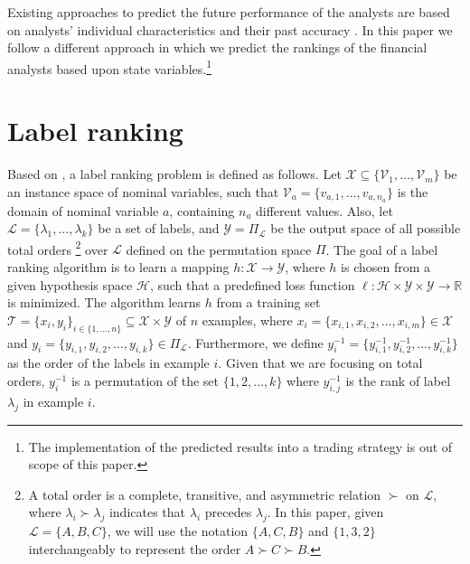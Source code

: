 \documentclass{article}\usepackage[]{graphicx}\usepackage[]{color}
\begin{document}
Existing approaches to predict the future performance of the analysts are based on analysts' individual characteristics \citep{clement1999} and their past accuracy \citep{brown2001}. In this paper we follow a different approach in which we predict the rankings of the financial analysts based upon state variables.\footnote{The implementation of the predicted results into a trading strategy is out of scope of this paper.}


\section{Label ranking}
\label{sec:labelranking}

Based on \cite{vembu2009}, a label ranking problem is defined as follows. Let $\mathcal{X} \subseteq \{\mathcal{V}_1,\ldots,\mathcal{V}_m\}$ be an instance space of nominal variables, such that $\mathcal{V}_a=\{v_{a,1}, \ldots, v_{a,n_a}\}$ is the domain of nominal variable $a$, containing $n_a$ different values.  Also, let $\mathcal{L} = \{\lambda_1,\ldots,\lambda_k\}$ be a set of labels, and $\mathcal{Y} = \Pi_{\mathcal{L}}$ be the output space of all possible total orders \footnote{A total order is a complete, transitive, and asymmetric relation $\succ$ on $\mathcal{L}$, where $\lambda_i \succ \lambda_j$ indicates that $\lambda_i$ precedes $\lambda_j$. In this paper, given $\mathcal{L}=\{A,B,C\}$, we will use the notation $\{A,C,B\}$ and $\{1,3,2\}$ interchangeably to represent the order $A \succ C \succ B$.}  over $\mathcal{L}$ defined on the permutation space $\Pi$. The goal of a label ranking algorithm is to learn a mapping $h: \mathcal{X} \rightarrow \mathcal{Y}$, where $h$ is chosen from a given hypothesis space $\mathcal{H}$, such that a predefined loss function $\ell: \mathcal{H} \times \mathcal{Y} \times \mathcal{Y} \rightarrow \mathbb{R}$ is minimized. The algorithm learns $h$ from a training set $\mathcal{T}=\{x_i,y_i\}_{i \in \{1, \ldots, n\}} \subseteq \mathcal{X} \times \mathcal{Y}$ of $n$ examples, where $x_i = \{x_{i,1}, x_{i,2}, \ldots, x_{i,m} \} \in \mathcal{X}$ and $ y_i = \{y_{i,1}, y_{i,2}, \dots, y_{i,k}\} \in \Pi_{\mathcal{L}}$. Furthermore, we define $y_i^{-1} = \{y_{i,1}^{-1}, y_{i,2}^{-1}, \ldots, y_{i,k}^{-1}\}$ as the order of the labels in example $i$. Given that we are focusing on total orders, $y_i^{-1}$ is a permutation of the set $\{1, 2, \ldots, k\}$ where $y_{i,j}^{-1}$ is the rank of label $\lambda_j$ in example $i$.
\end{document}

